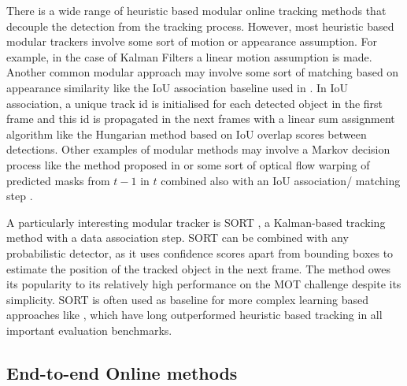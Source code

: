 There is a wide range of heuristic based modular online tracking methods that decouple the detection from the tracking process. 
However, most heuristic based modular trackers involve some sort of motion or appearance assumption. For example, in the case of Kalman Filters \parencite{kalmanfilter} a linear motion assumption is made. Another common modular approach may involve some sort of matching based on appearance similarity like the \gls{IoU} association baseline used in \parencite{step}. In IoU association, a unique track id is initialised for each detected object in the first frame and this id is propagated in the next frames with a linear sum assignment algorithm like the Hungarian method based on IoU overlap scores between detections. 
Other examples of modular methods may involve a Markov decision process like the method proposed in \parencite{mdp} or some sort of optical flow warping \parencite{raft} of predicted masks from $t-1$ in $t$ combined also with an IoU association/ matching step \parencite{step}.\par
A particularly interesting modular tracker is SORT \parencite{sort}, a Kalman-based tracking method with a data association step. 
SORT can be combined with any probabilistic detector, as it uses confidence scores apart from bounding boxes to estimate the position of the tracked object in the next frame. 
The method owes its popularity to its relatively high performance on the MOT challenge \parencite{mot17} despite its simplicity. 
SORT is often used as baseline for more complex learning based approaches like \cite{unicorn}, which have long outperformed heuristic based tracking in all important evaluation benchmarks.

\subsection{End-to-end Online methods}


